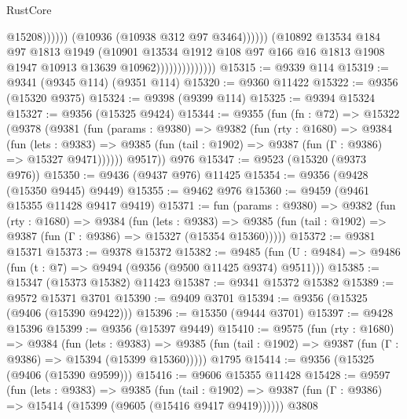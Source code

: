 \begin{lexlean}{RustCore}
\begin{coremodule}
                                                @15208))))))
                                    (@10936 (@10938 @312 @97 @3464))))))
                            (@10892
                              @13534
                              @184
                              @97
                              @1813
                              @1949
                              (@10901
                                @13534
                                @1912
                                @108
                                @97
                                @166
                                @16
                                @1813
                                @1908
                                @1947
                                @10913
                                @13639
                                @10962))))))))))))))
@15315 := @9339 @114
@15319 := @9341 (@9345 @114) (@9351 @114)
@15320 := @9360 @11422
@15322 := @9356 (@15320 @9375)
@15324 := @9398 (@9399 @114)
@15325 := @9394 @15324
@15327 := @9356 (@15325 @9424)
@15344 := @9355
    (fun (fn : @72) =>
    @15322
      (@9378
        (@9381
          (fun (params : @9380) =>
          @9382
            (fun (rty : @1680) =>
            @9384
              (fun (lets : @9383) =>
              @9385 (fun (tail : @1902) => @9387 (fun (Γ : @9386) => @15327 @9471))))))
        @9517))
    @976
@15347 := @9523 (@15320 (@9373 @976))
@15350 := @9436 (@9437 @976) @11425
@15354 := @9356 (@9428 (@15350 @9445) @9449)
@15355 := @9462 @976
@15360 := @9459 (@9461 @15355 @11428 @9417 @9419)
@15371 := fun (params : @9380) =>
  @9382
    (fun (rty : @1680) =>
    @9384
      (fun (lets : @9383) =>
      @9385 (fun (tail : @1902) => @9387 (fun (Γ : @9386) => @15327 (@15354 @15360)))))
@15372 := @9381 @15371
@15373 := @9378 @15372
@15382 := @9485
    (fun (U : @9484) => @9486 (fun (t : @7) => @9494 (@9356 (@9500 @11425 @9374) @9511)))
@15385 := @15347 (@15373 @15382) @11423
@15387 := @9341 @15372 @15382
@15389 := @9572 @15371 @3701
@15390 := @9409 @3701
@15394 := @9356 (@15325 (@9406 (@15390 @9422)))
@15396 := @15350 (@9444 @3701)
@15397 := @9428 @15396
@15399 := @9356 (@15397 @9449)
@15410 := @9575
    (fun (rty : @1680) =>
    @9384
      (fun (lets : @9383) =>
      @9385 (fun (tail : @1902) => @9387 (fun (Γ : @9386) => @15394 (@15399 @15360)))))
    @1795
@15414 := @9356 (@15325 (@9406 (@15390 @9599)))
@15416 := @9606 @15355 @11428
@15428 := @9597
    (fun (lets : @9383) =>
    @9385
      (fun (tail : @1902) =>
      @9387 (fun (Γ : @9386) => @15414 (@15399 (@9605 (@15416 @9417 @9419))))))
    @3808

\end{coremodule}
\end{lexlean}
